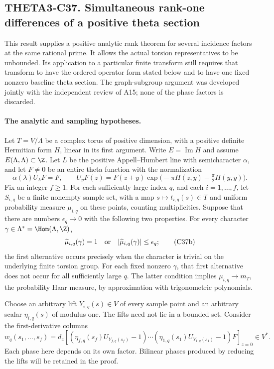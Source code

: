 \subsection{THETA3-C37. Simultaneous rank-one differences of a positive theta section}
\label{C37}

This result supplies a positive analytic rank theorem for several
incidence factors at the same rational prime.  It allows the actual
torsion representatives to be unbounded.  Its application to a particular
finite transform still requires that transform to have the ordered
operator form stated below and to have one fixed nonzero baseline theta
section.  The graph-subgroup argument was developed jointly with the
independent review of A15; none of the phase factors is discarded.

\paragraph{The analytic and sampling hypotheses.}
Let $T=V/\Lambda$ be a complex torus of positive dimension, with a
positive definite Hermitian form $H$, linear in its first argument.
Write $E=\operatorname{Im}H$ and assume $E(\Lambda,\Lambda)\subset\Z$.
Let $L$ be the positive Appell--Humbert line with semicharacter
$\alpha$, and let $F\ne0$ be an entire theta function with the
normalization
\[
 \alpha(\lambda)U_\lambda F=F,
 \qquad
 U_yF(z)=F(z+y)
       \exp\bigl(-\pi H(z,y)-\tfrac\pi2H(y,y)\bigr).
 \tag{C37a}
\]
Fix an integer $f\ge1$.  For each sufficiently large index $q$, and
each $i=1,\ldots,f$, let $S_{i,q}$ be a finite nonempty sample set,
with a map $s\mapsto t_{i,q}(s)\in T$ and uniform probability measure
$\mu_{i,q}$ on these points, counting multiplicities.  Suppose that
there are numbers $\epsilon_q\to0$ with the following two properties.
For every character $\gamma\in\Lambda^*=\Hom(\Lambda,\Z)$,
\[
 \widehat\mu_{i,q}(\gamma)=1
 \quad\hbox{or}\quad
 |\widehat\mu_{i,q}(\gamma)|\le\epsilon_q;
 \tag{C37b}
\]
the first alternative occurs precisely when the character is trivial
on the underlying finite torsion group.  For each fixed nonzero
$\gamma$, that first alternative does not occur for all sufficiently
large $q$.  The latter condition implies
$\mu_{i,q}\to m_T$, the probability Haar measure, by approximation
with trigonometric polynomials.

Choose an arbitrary lift $Y_{i,q}(s)\in V$ of every sample point and
an arbitrary scalar $\eta_{i,q}(s)$ of modulus one.  The lifts need
not lie in a bounded set.  Consider the first-derivative columns
\[
 w_q(s_1,\ldots,s_f)=
 d_z\left[
   (\eta_{f,q}(s_f)U_{Y_{f,q}(s_f)}-1)\cdots
   (\eta_{1,q}(s_1)U_{Y_{1,q}(s_1)}-1)F
       \right]_{z=0}\in V^*.
 \tag{C37c}
\]
Each phase here depends on its own factor.  Bilinear phases produced
by reducing the lifts will be retained in the proof.

